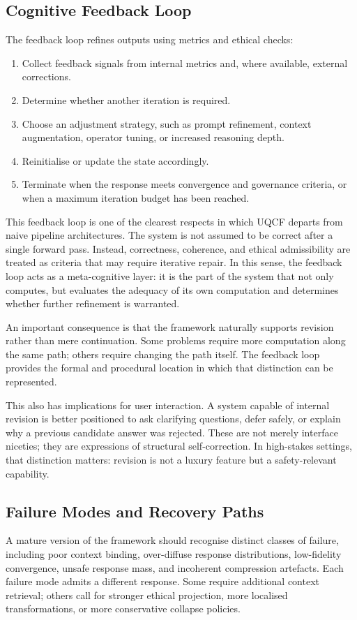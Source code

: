 \documentclass[12pt]{article}
\begin{document}
\subsection{Cognitive Feedback Loop}
The feedback loop refines outputs using metrics and ethical checks:
\begin{enumerate}[leftmargin=2em]
    \item Collect feedback signals from internal metrics and, where available, external corrections.
    \item Determine whether another iteration is required.
    \item Choose an adjustment strategy, such as prompt refinement, context augmentation, operator tuning, or increased reasoning depth.
    \item Reinitialise or update the state accordingly.
    \item Terminate when the response meets convergence and governance criteria, or when a maximum iteration budget has been reached.
\end{enumerate}

This feedback loop is one of the clearest respects in which UQCF departs from naive pipeline architectures. The system is not assumed to be correct after a single forward pass. Instead, correctness, coherence, and ethical admissibility are treated as criteria that may require iterative repair. In this sense, the feedback loop acts as a meta-cognitive layer: it is the part of the system that not only computes, but evaluates the adequacy of its own computation and determines whether further refinement is warranted.

An important consequence is that the framework naturally supports revision rather than mere continuation. Some problems require more computation along the same path; others require changing the path itself. The feedback loop provides the formal and procedural location in which that distinction can be represented.

This also has implications for user interaction. A system capable of internal revision is better positioned to ask clarifying questions, defer safely, or explain why a previous candidate answer was rejected. These are not merely interface niceties; they are expressions of structural self-correction. In high-stakes settings, that distinction matters: revision is not a luxury feature but a safety-relevant capability.

\subsection{Failure Modes and Recovery Paths}
A mature version of the framework should recognise distinct classes of failure, including poor context binding, over-diffuse response distributions, low-fidelity convergence, unsafe response mass, and incoherent compression artefacts. Each failure mode admits a different response. Some require additional context retrieval; others call for stronger ethical projection, more localised transformations, or more conservative collapse policies.
\end{document}
